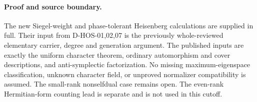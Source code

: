 \paragraph{Proof and source boundary.}
The new Siegel-weight and phase-tolerant Heisenberg calculations
are supplied in full. Their input from D-HOS-01,02,07 is the
previously whole-reviewed elementary carrier, degree and generation
argument. The published inputs are exactly the uniform character
theorem, ordinary automorphism and cover descriptions, and
anti-symplectic factorization. No missing maximum-eigenspace
classification, unknown character field, or unproved normalizer
compatibility is assumed. The small-rank nonselfdual case remains
open. The even-rank Hermitian-form counting lead is separate and
is not used in this cutoff.

